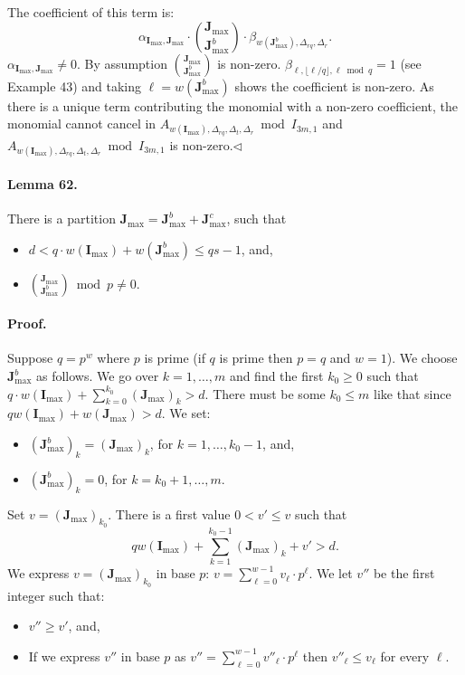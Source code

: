 The coefficient of this term is:
\[\alpha_{\boldsymbol I_{\max},\boldsymbol J_{\max}}\cdot\binom{\boldsymbol J_{\max}}{\boldsymbol J_{\max}^b}\cdot\beta_{w(\boldsymbol J_{\max}^b),\Delta_{rq},\Delta_r}.\]
$\alpha_{\boldsymbol I_{\max},\boldsymbol J_{\max}}\neq0$. By assumption $\binom{\boldsymbol J_{\max}}{\boldsymbol J_{\max}^b}$ is non-zero. $\beta_{\ell,\lfloor\ell/q\rfloor,\ell\bmod q}=1$ (see Example 43) and taking $\ell=w(\boldsymbol J_{\max}^b)$ shows the coefficient is non-zero. As there is a unique term contributing the monomial with a non-zero coefficient, the monomial cannot cancel in $A_{w(\boldsymbol I_{\max}),\Delta_{rq},\Delta_t,\Delta_r}\bmod I_{3m,1}$ and $A_{w(\boldsymbol I_{\max}),\Delta_{rq},\Delta_t,\Delta_r}\bmod I_{3m,1}$ is non-zero.\hfill$\triangleleft$
\paragraph{Lemma 62.} There is a partition $\boldsymbol J_{\max}=\boldsymbol J_{\max}^b+\boldsymbol J_{\max}^c$, such that
\begin{itemize}
\item $d<q\cdot w(\boldsymbol I_{\max})+w(\boldsymbol J_{\max}^b)\leq qs-1$, and,
\item $\binom{\boldsymbol J_{\max}}{\boldsymbol J_{\max}^b}\bmod p\neq0$.
\end{itemize}
\paragraph{Proof.} Suppose $q=p^w$ where $p$ is prime (if $q$ is prime then $p=q$ and $w=1$). We choose $\boldsymbol J_{\max}^b$ as follows. We go over $k=1,\ldots,m$ and find the first $k_0\geq0$ such that $q\cdot w(\boldsymbol I_{\max})+\sum_{k=0}^{k_0}(\boldsymbol J_{\max})_k>d$. There must be some $k_0\leq m$ like that since $qw(\boldsymbol I_{\max})+w(\boldsymbol J_{\max})>d$. We set:
\begin{itemize}
\item $(\boldsymbol J_{\max}^b)_k=(\boldsymbol J_{\max})_k$, for $k=1,\ldots,k_0-1$, and,
\item $(\boldsymbol J_{\max}^b)_k=0$, for $k=k_0+1,\ldots,m$.
\end{itemize}
Set $v=(\boldsymbol J_{\max})_{k_0}$. There is a first value $0<v'\leq v$ such that
\[qw(\boldsymbol I_{\max})+\sum_{k=1}^{k_0-1}(\boldsymbol J_{\max})_k+v'>d.\]
We express $v=(\boldsymbol J_{\max})_{k_0}$ in base $p$: $v=\sum_{\ell=0}^{w-1}v_\ell\cdot p^\ell$. We let $v''$ be the first integer such that:
\begin{itemize}
\item $v''\geq v'$, and,
\item If we express $v''$ in base $p$ as $v''=\sum_{\ell=0}^{w-1}v''_\ell\cdot p^\ell$ then $v''_\ell\leq v_\ell$ for every $\ell$.
\end{itemize}
